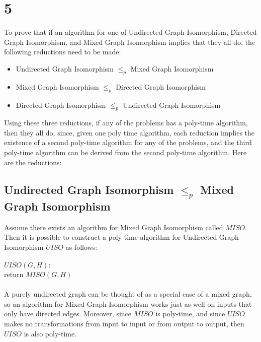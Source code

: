 \documentclass[letterpaper,notitlepage,twoside]{article}
\newcommand\tab[1][1cm]{\hspace*{#1}} %
\begin{document}
\section*{5}
To prove that if an algorithm for one of Undirected Graph Isomorphism, Directed Graph Isomorphism, and Mixed Graph Isomorphism implies that they all do, the following reductions need to be made:
\begin{itemize}
    \item Undirected Graph Isomorphism $\leq_p$ Mixed Graph Isomorphism
    \item Mixed Graph Isomorphism $\leq_p$ Directed Graph Isomorphism
    \item Directed Graph Isomorphism $\leq_p$ Undirected Graph Isomorphism
\end{itemize}
Using these three reductions, if any of the problems has a poly-time algorithm, then they all do, since, given one poly time algorithm, each reduction implies the existence of a second poly-time algorithm for any of the problems, and the third poly-time algorithm can be derived from the second poly-time algorithm.
Here are the reductions:
\subsection*{Undirected Graph Isomorphism $\leq_p$ Mixed Graph Isomorphism}
Assume there exists an algorithm for Mixed Graph Isomorphism called $MISO$. Then it is possible to construct a poly-time algorithm for Undirected Graph Isomorphism $UISO$ as follows:
\\\\
$UISO(G, H):$\\
\tab return $MISO(G, H)$
\\\\
A purely undirected graph can be thought of as a special case of a mixed graph, so an algorithm for Mixed Graph Isomorphism works just as well on inputs that only have directed edges. Moreover, since $MISO$ is poly-time, and since $UISO$ makes no transformations from input to input or from output to output, then $UISO$ is also poly-time.
\end{document}
